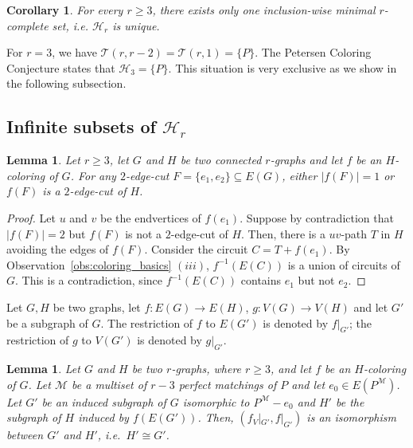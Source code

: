 \documentclass[a4paper,11pt]{article}
\newcommand{\ca}{\mathcal}
\newtheorem{lem}[defi]{Lemma}
\newtheorem{cor}[defi]{Corollary}
\theoremstyle{remark}
\begin{document}
\begin{cor}
For every $r \geq 3$, there exists only one inclusion-wise minimal $r$-complete set, i.e. $\ca H_r$ is unique.
\label{cor:H_r unique}
\end{cor}


For $r=3$, we have $\ca T(r,r-2)=\ca T(r,1) = \{P\}$. The Petersen Coloring Conjecture states that $\ca H_3=\{P\}$. This situation is very exclusive as we show in the following subsection.

\subsection{Infinite subsets of $\ca H_r$}



\begin{lem}\label{Lemma-2-cut-image}
	Let $r \geq 3$, let $G$ and $H$ be two connected $ r $-graphs and let $f$ be an $H$-coloring of $G$. For any $ 2 $-edge-cut $ F=\{e_1,e_2\}\subseteq E(G) $, either $ |f(F)|=1 $ or $ f(F) $ is a $2$-edge-cut of $ H $.
\end{lem}

\begin{proof}
	Let $u$ and $v$ be the endvertices of $f(e_1)$.	Suppose by contradiction that $|f(F)|=2$ but $f(F)$ is not a $2$-edge-cut of $H$. Then, there is a $uv$-path $T$ in $H$ avoiding the edges of $f(F)$. Consider the circuit $C=T+f(e_1)$. By Observation~\ref{obs:coloring_basics} $(iii)$, $f^{-1}(E(C))$ is a union of circuits of $G$. This is a contradiction, since $f^{-1}(E(C))$ contains $e_1$ but not $e_2$.
\end{proof}











Let $G,H$ be two graphs, let $f \colon E(G) \to E(H)$, $g \colon V(G) \to V(H)$ and let $G'$ be a subgraph of $G$. The restriction of $f$ to $E(G')$ is denoted by $f|_{G'}$; the restriction of $g$ to $V(G')$ is denoted by $g|_{G'}$.


\begin{lem}\label{Lemma-PM-e-cong-itselt}
	Let $G$ and $H$ be two $ r $-graphs, where $r \geq 3$, and let $f$ be an $H$-coloring of $G$. 
	Let $\ca M$ be a multiset of $r-3 $ perfect matchings of  $P$ and let $ e_0\in E(P^{\ca M}) $. Let $ G' $ be an induced subgraph of $ G $ isomorphic to $P^{\ca M}-e_0$ and $ H' $ be the subgraph of $ H $ induced by $ f(E(G')) $. 
Then, $ (f_V|_{G'} , f|_{G'} ) $ is an isomorphism between $ G' $ and $ H' $, i.e.\ $ H'\cong G' $.  
\end{lem}
\end{document}
